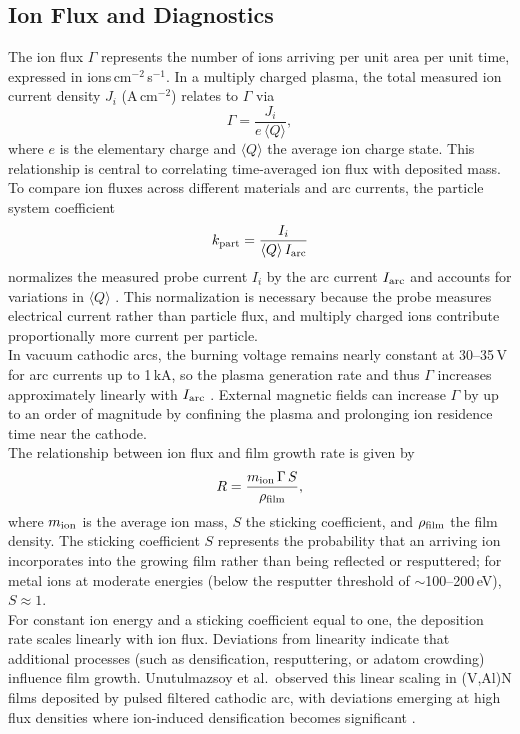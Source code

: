 \subsection{Ion Flux and Diagnostics}
\label{section:ion_flux}

The ion flux $\Gamma$ represents the number of ions arriving per unit area per unit time, expressed in ions\,cm$^{-2}$\,s$^{-1}$. In a multiply charged plasma, the total measured ion current density $J_i$ (A\,cm$^{-2}$) relates to $\Gamma$ via
\begin{equation}
	\Gamma = \frac{J_i}{e\,\langle Q \rangle},
\end{equation}
where $e$ is the elementary charge and $\langle Q \rangle$ the average ion charge state. This relationship is central to correlating time-averaged ion flux with deposited mass.\\

To compare ion fluxes across different materials and arc currents, the particle system coefficient
\begin{equation}
	k_{\rm part} = \frac{I_i}{\langle Q \rangle\,I_{\rm arc}}
\end{equation}
normalizes the measured probe current $I_i$ by the arc current $I_{\rm arc}$ and accounts for variations in $\langle Q \rangle$ \cite[Chap.~6.5]{cathodic_arcs}. This normalization is necessary because the probe measures electrical current rather than particle flux, and multiply charged ions contribute proportionally more current per particle.\\

In vacuum cathodic arcs, the burning voltage remains nearly constant at 30–35\,V for arc currents up to 1\,kA, so the plasma generation rate and thus $\Gamma$ increases approximately linearly with $I_{\rm arc}$ \cite[Chap.~6.5]{cathodic_arcs}. External magnetic fields can increase $\Gamma$ by up to an order of magnitude by confining the plasma and prolonging ion residence time near the cathode.\\

The relationship between ion flux and film growth rate is given by
\begin{equation}
	R = \frac{m_{\rm ion}\,\Gamma\,S}{\rho_{\rm film}},
\end{equation}
where $m_{\rm ion}$ is the average ion mass, $S$ the sticking coefficient, and $\rho_{\rm film}$ the film density. The sticking coefficient $S$ represents the probability that an arriving ion incorporates into the growing film rather than being reflected or resputtered; for metal ions at moderate energies (below the resputter threshold of $\sim$100–200\,eV), $S \approx 1$.\\
For constant ion energy and a sticking coefficient equal to one, the deposition rate scales linearly with ion flux. Deviations from linearity indicate that additional processes (such as densification, resputtering, or adatom crowding) influence film growth. Unutulmazsoy et al.\ observed this linear scaling in (V,Al)N films deposited by pulsed filtered cathodic arc, with deviations emerging at high flux densities where ion-induced densification becomes significant \cite{unutulmazsoy}.\\

